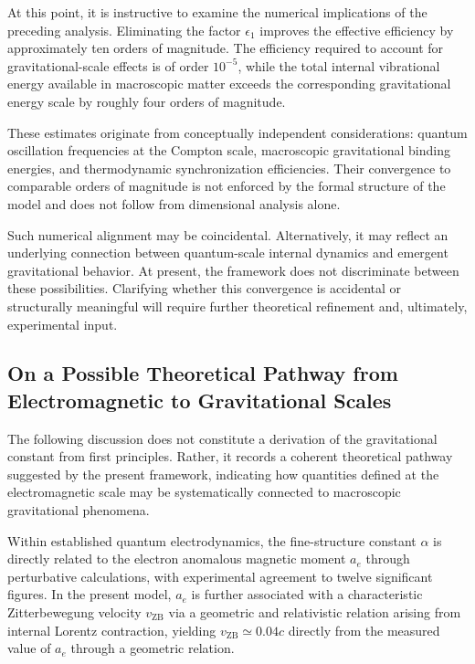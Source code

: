 \documentclass[12pt,letterpaper]{article}
\begin{document}
At this point, it is instructive to examine the numerical implications of the preceding analysis. Eliminating the factor $\epsilon_1$ improves the effective efficiency by approximately ten orders of magnitude. The efficiency required to account for gravitational-scale effects is of order $10^{-5}$, while the total internal vibrational energy available in macroscopic matter exceeds the corresponding gravitational energy scale by roughly four orders of magnitude.

These estimates originate from conceptually independent considerations: quantum oscillation frequencies at the Compton scale, macroscopic gravitational binding energies, and thermodynamic synchronization efficiencies. Their convergence to comparable orders of magnitude is not enforced by the formal structure of the model and does not follow from dimensional analysis alone.

Such numerical alignment may be coincidental. Alternatively, it may reflect an underlying connection between quantum-scale internal dynamics and emergent gravitational behavior. At present, the framework does not discriminate between these possibilities. Clarifying whether this convergence is accidental or structurally meaningful will require further theoretical refinement and, ultimately, experimental input.


\subsection{On a Possible Theoretical Pathway from Electromagnetic to Gravitational Scales}

The following discussion does not constitute a derivation of the gravitational constant from first principles. Rather, it records a coherent theoretical pathway suggested by the present framework, indicating how quantities defined at the electromagnetic scale may be systematically connected to macroscopic gravitational phenomena.

Within established quantum electrodynamics, the fine-structure constant $\alpha$ is directly related to the electron anomalous magnetic moment $a_e$ through perturbative calculations, with experimental agreement to twelve significant figures. In the present model, $a_e$ is further associated with a characteristic Zitterbewegung velocity $v_{\mathrm{ZB}}$ via a geometric and relativistic relation arising from internal Lorentz contraction, yielding $v_{\mathrm{ZB}} \simeq 0.04c$ directly from the measured value of $a_e$ through a geometric relation.
\end{document}
